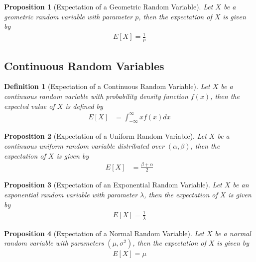 \documentclass[11pt, oneside]{book}   	%
\newtheorem{definition}{Definition}[chapter]
\newtheorem{proposition}{Proposition}[chapter]
\begin{document}
\begin{spacing}{1.618}
\begin{proposition}[Expectation of a Geometric Random Variable]
	Let $X$ be a geometric random variable with parameter $p$, then the expectation of $X$ is given by 
	\begin{alignat}{4}
		E[X]=\frac{1}{p}
	\end{alignat}
\end{proposition}

\subsection{Continuous Random Variables}
\begin{definition}[Expectation of a Continuous Random Variable]
	Let $X$ be a continuous random variable with probability density function $f(x)$, then the \emph{expected value} of $X$ is defined by
	\begin{alignat}{4}
		E[X]&=\int_{-\infty}^\infty xf(x)dx
	\end{alignat}
\end{definition}

\begin{proposition}[Expectation of a Uniform Random Variable]
	Let $X$ be a continuous uniform random variable distributed over $(\alpha, \beta)$, then the expectation of $X$ is given by 
	\begin{alignat}{4}
		E[X]&=\frac{\beta+\alpha}{2}
	\end{alignat}
\end{proposition}

\begin{proposition}[Expectation of an Exponential Random Variable]
	Let $X$ be an exponential random variable with parameter $\lambda$, then the expectation of $X$ is given by 
	\begin{alignat}{4}
		E[X]=\frac{1}{\lambda}
	\end{alignat}
\end{proposition}

\begin{proposition}[Expectation of a Normal Random Variable]
	Let $X$ be a normal random variable with parameters $(\mu, \sigma^2)$, then the expectation of $X$ is given by 
	\begin{alignat}{4}
		E[X]=\mu
	\end{alignat}
\end{proposition}


\end{spacing}
\end{document}
